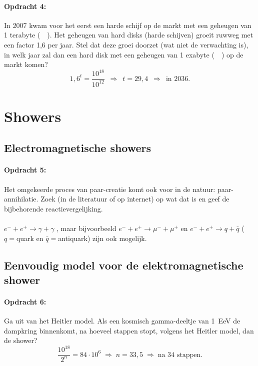 \begin{minipage}[t]{1\columnwidth}
\paragraph{Opdracht 4:}
In 2007 kwam voor het eerst een harde schijf op de markt met een
geheugen van 1 terabyte (\SI{}{\tera\byte}). Het geheugen van hard disks
(harde schijven) groeit ruwweg met een factor 1,6 per jaar. Stel dat
deze groei doorzet (wat niet de verwachting is), in welk jaar zal dan
een hard disk met een geheugen van 1 exabyte (\SI{}{\exa\byte}) op de
markt komen? 
\begin{equation}
    1,6^t = \frac{10^{18}}{10^{12}} \, \, \,
    \Rightarrow \, \, \, t = 29,4 \,\,\,
    \Rightarrow \, \, \, \textrm{in } 2036. \nonumber
\end{equation}
\end{minipage}


\section{Showers}

\subsection{Electromagnetische showers}

\begin{minipage}[t]{1\columnwidth}
\paragraph{Opdracht 5:}
Het omgekeerde proces van paar-creatie komt ook voor in de natuur:
paar-annihilatie. Zoek (in de literatuur of op internet) op wat dat is
en geef de bijbehorende reactievergelijking. 
\\ \\
$e^- + e^+ \rightarrow \gamma + \gamma$ ,  maar bijvoorbeeld
$e^- + e^+ \rightarrow \mu^- + \mu^+$ en
$e^- + e^+ \rightarrow q + \bar{q}$ ($q=$quark en $\bar{q}=$antiquark)
zijn ook mogelijk.
\end{minipage}


\subsection{Eenvoudig model voor de elektromagnetische shower}

\begin{minipage}[t]{1\columnwidth}
\paragraph{Opdracht 6:}
Ga uit van het Heitler model. Als een kosmisch gamma-deeltje van
\SI{1}{\exa\electronvolt} de dampkring binnenkomt, na hoeveel stappen
stopt, volgens het Heitler model, dan de shower? 
\begin{equation}
\frac{10^{18}}{2^n}=84 \cdot 10^6
\;\Rightarrow\; n=33,5
\;\Rightarrow\; \textrm{na } 34 \textrm{ stappen}. \nonumber
\end{equation}
\end{minipage}


